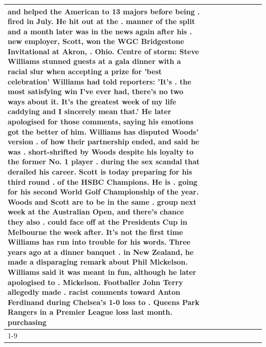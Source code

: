 \begin{table}[H]
\begin{tabular}{lllrlllll}
and helped the American to 13 majors before being . fired in July. He hit out at the . manner of the split and a month later was in the news again after his . new employer, Scott, won the WGC Bridgestone Invitational at Akron, . Ohio. Centre of storm: Steve Williams stunned guests at a gala dinner with a racial slur when accepting a prize for 'best celebration' Williams had told reporters: 'It's . the most satisfying win I've ever had, there's no two ways about it. It's the greatest week of my life caddying and I sincerely mean that.' He later apologised for those comments, saying his emotions got the better of him. Williams has disputed Woods' version . of how their partnership ended, and said he was . short-shrifted by Woods despite his loyalty to the former No. 1 player . during the sex scandal that derailed his career. Scott is today preparing for his third round . of the HSBC Champions. He is . going for his second World Golf Championship of the year. Woods and Scott are to be in the same . group next week at the Australian Open, and there's chance they also . could face off at the Presidents Cup in Melbourne the week after. It's not the first time Williams has run into trouble for his words. Three years ago at a dinner banquet . in New Zealand, he made a disparaging remark about Phil Mickelson. Williams said it was meant in fun, although he later apologised to . Mickelson. Footballer John Terry allegedly made . racist comments toward Anton Ferdinand during Chelsea's 1-0 loss to . Queens Park Rangers in a Premier League loss last month. purchasing \\
\cline{1-9}

\end{tabular}
\end{table}
